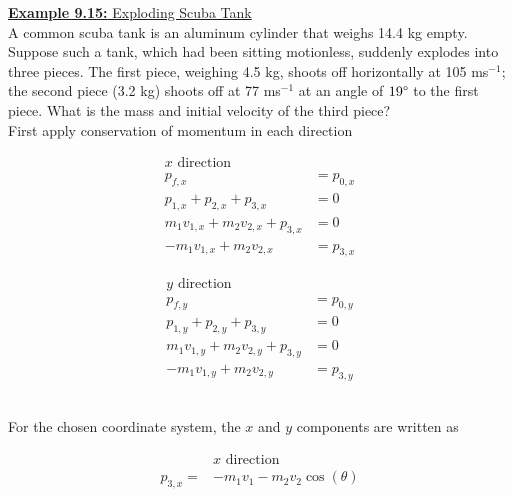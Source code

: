 \documentclass[a4paper]{article}
\let\bf\textbf
\begin{document}
\newpage
\begin{shaded}
    \underline{\bf{Example 9.15:} Exploding Scuba Tank}
    \vspace{2mm}\\
    A common scuba tank is an aluminum cylinder that weighs 14.4 kg empty. Suppose such a tank, which had been sitting motionless, suddenly explodes into three pieces. The first piece, weighing 4.5 kg, shoots off horizontally at 105 ms$^{-1}$; the second piece (3.2 kg) shoots off at 77 ms$^{-1}$ at an angle of $19\degree$ to the first piece. What is the mass and initial velocity of the third piece?
    \vspace{1mm}\\
    First apply conservation of momentum in each direction\\
    \begin{minipage}{0.45\textwidth}
        \begin{align*}
            \text{$x$ direction}\\
            p_{f,x} &= p_{0,x}\\
            p_{1,x} + p_{2,x} + p_{3,x} &= 0\\
            m_1v_{1,x} + m_2v_{2,x} + p_{3,x} &= 0\\
            -m_1v_{1,x} + m_2v_{2,x} &= p_{3,x}
        \end{align*}
    \end{minipage}
    \begin{minipage}{0.45\textwidth}
        \begin{align*}
            \text{$y$ direction}\\
            p_{f,y} &= p_{0,y}\\
            p_{1,y} + p_{2,y} + p_{3,y} &= 0\\
            m_1v_{1,y} + m_2v_{2,y} + p_{3,y} &= 0\\
            -m_1v_{1,y} + m_2v_{2,y} &= p_{3,y}
        \end{align*}
    \end{minipage}
    \vspace{2mm}\\
    For the chosen coordinate system, the $x$ and $y$ components are written as
    \vspace{0mm}\\
    \begin{minipage}{0.45\textwidth}
        \begin{align*}
            &\text{$x$ direction}\\
            p_{3,x} =& -m_1v_1 - m_2v_2\cos(\theta)\\

\end{align*}
\end{minipage}
\end{shaded}
\end{document}

